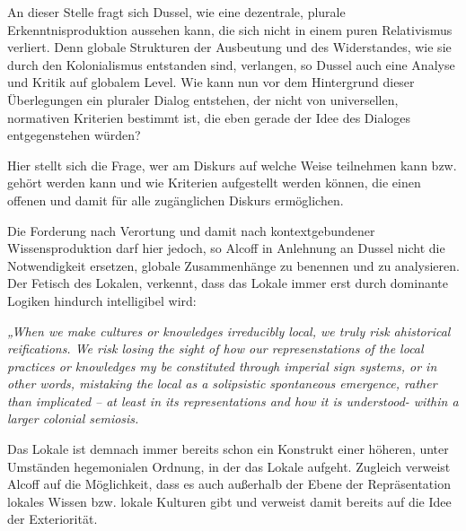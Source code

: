 An dieser Stelle fragt sich Dussel, wie eine dezentrale, plurale
Erkenntnisproduktion aussehen kann, die sich nicht in einem puren Relativismus
verliert. Denn globale Strukturen der Ausbeutung und des Widerstandes, wie sie
durch den Kolonialismus entstanden sind, verlangen, so Dussel auch eine Analyse
und Kritik auf globalem Level. Wie kann nun vor dem Hintergrund dieser
Überlegungen ein pluraler Dialog entstehen, der nicht von universellen,
normativen Kriterien bestimmt ist, die eben gerade der Idee des Dialoges
entgegenstehen würden?

Hier stellt sich die Frage, wer am Diskurs auf welche Weise teilnehmen kann bzw.
gehört werden kann und wie Kriterien aufgestellt werden können, die einen
offenen und damit für alle zugänglichen Diskurs ermöglichen.

Die Forderung nach Verortung und damit nach kontextgebundener Wissensproduktion
darf hier  jedoch, so Alcoff in Anlehnung an Dussel nicht die Notwendigkeit
ersetzen, globale Zusammenhänge zu benennen und zu analysieren. Der Fetisch des
Lokalen, verkennt, dass das Lokale immer erst durch dominante Logiken hindurch
intelligibel wird:

\begin{myenv}
    \textit{„When we make cultures or knowledges irreducibly local, we truly
    risk ahistorical reifications. We risk losing the sight of how our
    represenstations of the local practices or knowledges my be constituted
    through imperial sign systems, or in other words, mistaking the local as a
    solipsistic spontaneous emergence, rather than implicated – at least in its
    representations and how it is understood- within a larger colonial
    semiosis.\footnotemark {}}
\end{myenv}

Das Lokale ist demnach immer bereits schon ein Konstrukt einer höheren, unter
Umständen hegemonialen Ordnung, in der das Lokale aufgeht. Zugleich verweist
Alcoff auf die Möglichkeit, dass es auch außerhalb der Ebene der Repräsentation
lokales Wissen bzw. lokale Kulturen gibt und verweist damit bereits auf die Idee
der Exteriorität.

